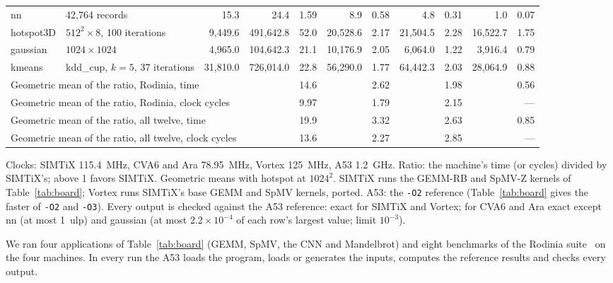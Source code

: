 \documentclass[journal]{IEEEtran}
\begin{document}
\begin{table}[t]
\begin{tabular}{llrrrrrrrrr}
nn         & 42,764 records                & 15.3    & 24.4      & 1.59 & 8.9      & 0.58 & 4.8      & 0.31 & 1.0      & 0.07\\
hotspot3D  & $512^2\times8$, 100 iterations & 9,449.6 & 491,642.8 & 52.0 & 20,528.6 & 2.17 & 21,504.5 & 2.28 & 16,522.7 & 1.75\\
gaussian   & $1024\times1024$              & 4,965.0 & 104,642.3 & 21.1 & 10,176.9 & 2.05 & 6,064.0  & 1.22 & 3,916.4  & 0.79\\
kmeans     & kdd\_cup, $k=5$, 37 iterations & 31,810.0 & 726,014.0 & 22.8 & 56,290.0 & 1.77 & 64,442.3 & 2.03 & 28,064.9 & 0.88\\
\midrule
\multicolumn{3}{l}{Geometric mean of the ratio, Rodinia, time} & & 14.6 & & 2.62 & & 1.98 & & 0.56\\
\multicolumn{3}{l}{Geometric mean of the ratio, Rodinia, clock cycles} & & 9.97 & & 1.79 & & 2.15 & & ---\\
\multicolumn{3}{l}{Geometric mean of the ratio, all twelve, time} & & 19.9 & & 3.32 & & 2.63 & & 0.85\\
\multicolumn{3}{l}{Geometric mean of the ratio, all twelve, clock cycles} & & 13.6 & & 2.27 & & 2.85 & & ---\\
\bottomrule
\end{tabular}

\vspace{2pt}
\begin{minipage}{\textwidth}\footnotesize
Clocks: SIMTiX 115.4~MHz, CVA6 and Ara 78.95~MHz, Vortex 125~MHz, A53 1.2~GHz. Ratio:
the machine's time (or cycles) divided by SIMTiX's; above 1 favors SIMTiX. Geometric
means with hotspot at $1024^2$. SIMTiX runs the GEMM-RB and SpMV-Z kernels of
Table~\ref{tab:board}; Vortex runs SIMTiX's base GEMM and SpMV kernels, ported. A53:
the \texttt{-O2} reference (Table~\ref{tab:board} gives the faster of \texttt{-O2} and
\texttt{-O3}). Every output is checked against the A53 reference: exact for SIMTiX and
Vortex; for CVA6 and Ara exact except nn (at most 1~ulp) and gaussian (at most
$2.2\times10^{-4}$ of each row's largest value; limit $10^{-3}$).
\end{minipage}
\end{table}

We ran four applications of Table~\ref{tab:board} (GEMM, SpMV, the CNN and
Mandelbrot) and eight benchmarks of the Rodinia suite~\cite{rodinia} on the four
machines. In every run the A53 loads the program, loads or generates the inputs,
computes the reference results and checks every output.
\end{document}
